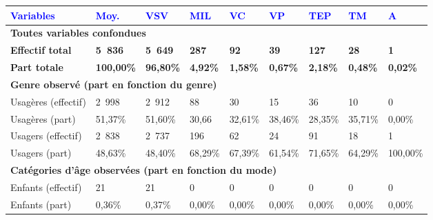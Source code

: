         \begin{longtable}{p{3.7cm}p{0.9cm}p{0.9cm}p{0.9cm}p{0.9cm}p{0.9cm}p{0.9cm}p{0.9cm}p{0.9cm}}
         \textcolor{blue}{\textbf{Variables}} & \textcolor{blue}{\textbf{Moy.}} & \textcolor{blue}{\textbf{VSV}} & \textcolor{blue}{\textbf{MIL}} & \textcolor{blue}{\textbf{VC}} & \textcolor{blue}{\textbf{VP}} & \textcolor{blue}{\textbf{TEP}} & \textcolor{blue}{\textbf{TM}} & \textcolor{blue}{\textbf{A}}\\
        \hline
        \endhead
\multicolumn{9}{l}{\textbf{Toutes variables confondues}}\\
    \small{\textbf{Effectif total}} & \small{\textbf{5~836}} & \small{\textbf{5~649}} & \small{\textbf{287}} & \small{\textbf{92}} & \small{\textbf{39}} & \small{\textbf{127}} & \small{\textbf{28}} & \small{\textbf{1}}\\   
    \small{\textbf{Part totale}} & \small{\textbf{100,00\%}} & \small{\textbf{96,80\%}} & \small{\textbf{4,92\%}} & \small{\textbf{1,58\%}} & \small{\textbf{0,67\%}} & \small{\textbf{2,18\%}} & \small{\textbf{0,48\%}} & \small{\textbf{0,02\%}}\\
    \hline    
\multicolumn{9}{l}{\textbf{Genre observé (part en fonction du genre)}}\\
    \small{Usagères (effectif)} & \small{2~998} & \small{2~912} & \small{88} & \small{30} & \small{15} & \small{36} & \small{10} & \small{0}\\    
    \small{Usagères (part)} & \small{51,37\%} & \small{51,60\%} & \small{30,66} & \small{32,61\%} & \small{38,46\%} & \small{28,35\%} & \small{35,71\%} & \small{0,00\%}\\    
    \small{Usagers (effectif)} & \small{2~838} & \small{2~737} & \small{196} & \small{62} & \small{24} & \small{91} & \small{18} & \small{1}\\    
    \small{Usagers (part)} & \small{48,63\%} & \small{48,40\%} & \small{68,29\%} & \small{67,39\%} & \small{61,54\%} & \small{71,65\%} & \small{64,29\%} & \small{100,00\%}\\   
    \hline
\multicolumn{9}{l}{\textbf{Catégories d'âge observées (part en fonction du mode)}}\\
    \small{Enfants (effectif)} & \small{21} & \small{21} & \small{0} & \small{0} & \small{0} & \small{0} & \small{0} & \small{0}\\    
    \small{Enfants (part)} & \small{0,36\%} & \small{0,37\%} & \small{0,00\%} & \small{0,00\%} & \small{0,00\%} & \small{0,00\%} & \small{0,00\%} & \small{0,00\%}\\    

\end{longtable}
